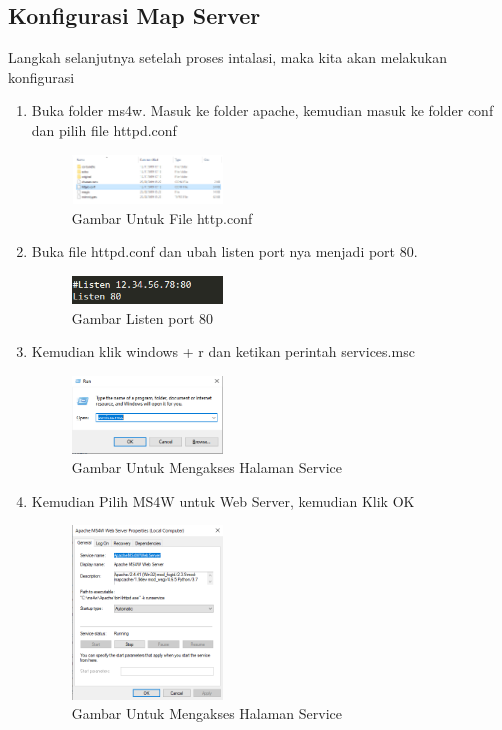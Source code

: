 \subsection{Konfigurasi Map Server}
Langkah selanjutnya setelah proses intalasi, maka kita akan melakukan konfigurasi
\begin{enumerate}
  \item Buka folder ms4w. Masuk ke folder apache, kemudian masuk ke folder conf dan pilih file httpd.conf
\hfill\break
  \begin{figure}[H]
  \includegraphics[width=4cm]{figures/tugas4/1174062/5.png}
  \centering
  \caption{Gambar Untuk File http.conf}
  \end{figure}
  
  \item Buka file httpd.conf dan ubah listen port nya menjadi port 80.
  
\hfill\break
  \begin{figure}[H]
  \includegraphics[width=4cm]{figures/tugas4/1174062/6.png}
  \centering
  \caption{Gambar Listen port 80}
  \end{figure}
  
  \item Kemudian klik windows + r dan ketikan perintah services.msc
    
\hfill\break
  \begin{figure}[H]
  \includegraphics[width=4cm]{figures/tugas4/1174062/7.png}
  \centering
  \caption{Gambar Untuk Mengakses Halaman Service}
  \end{figure}
  
  \item Kemudian Pilih MS4W untuk Web Server, kemudian Klik OK
 \hfill\break
  \begin{figure}[H]
  \includegraphics[width=4cm]{figures/tugas4/1174062/4.png}
  \centering
  \caption{Gambar Untuk Mengakses Halaman Service}
  \end{figure}
  

\end{enumerate}
